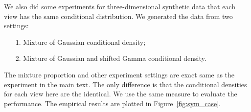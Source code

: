 

We also did some experiments for three-dimensional synthetic data that each view has the same conditional distribution. We generated the data from two settings:
\begin{itemize}
\item[1.] Mixture of Gaussian conditional density;
\item[2.] Mixture of Gaussian and shifted Gamma conditional density.
\end{itemize}
The mixture proportion and other experiment settings are exact same as the experiment in the main text. The only difference is that the conditional densities for each view here are the identical. We use the same measure to evaluate the performance. The empirical results are plotted in Figure~\ref{fig:sym_case}.

